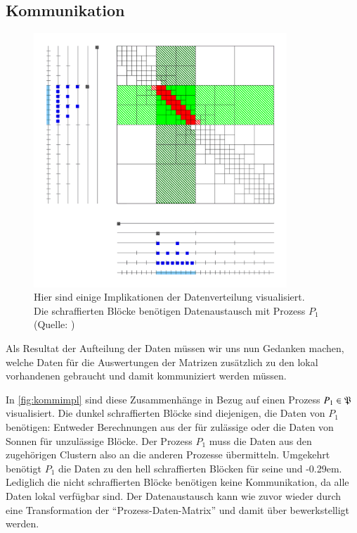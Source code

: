   \subsection{Kommunikation}
  \label{sec:komm}
    \begin{figure}[t]
      \includegraphics[width=0.85\textwidth]{img/kommimpl.png}
      \caption{Hier sind einige Implikationen der Datenverteilung visualisiert.\\
	       Die schraffierten Blöcke benötigen Datenaustausch mit Prozess $P_1$\\
	       (Quelle: \citet{h2slides})}
      \label{fig:kommimpl}
    \end{figure}

    Als Resultat der Aufteilung der Daten müssen wir uns nun Gedanken machen, welche Daten für die Auswertungen der Matrizen zusätzlich zu den lokal vorhandenen gebraucht und damit kommuniziert werden 
    müssen.
    
    In \autoref{fig:kommimpl} sind diese Zusammenhänge in Bezug auf einen Prozess $P_1 \in \mathfrak{P}$ visualisiert. Die dunkel schraffierten Blöcke sind diejenigen, die Daten von $P_1$ benötigen: 
    Entweder Berechnungen aus der \vorw für zulässige oder die Daten von Sonnen für unzulässige Blöcke. Der Prozess $P_1$ muss die Daten aus den zugehörigen Clustern also an die anderen Prozesse 
    übermitteln. Umgekehrt benötigt $P_1$ die Daten zu den hell schraffierten Blöcken für seine \koppl und \ruckw \kern-0.29em. Lediglich die nicht schraffierten Blöcke benötigen keine Kommunikation, da alle
    Daten lokal verfügbar sind. Der Datenaustausch kann wie zuvor wieder durch eine Transformation der ``Prozess-Daten-Matrix'' und damit über  bewerkstelligt werden. 
    
